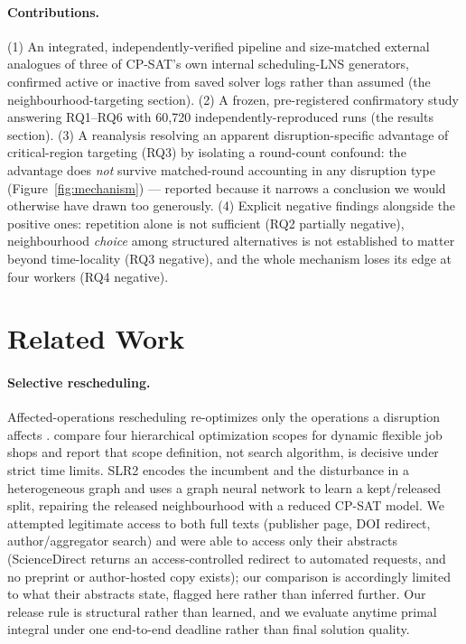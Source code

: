 \documentclass[letterpaper]{article} %
\begin{document}
\paragraph{Contributions.} (1) An integrated, independently-verified pipeline and size-matched external analogues of three of CP-SAT's own internal scheduling-LNS generators, confirmed active or inactive from saved solver logs rather than assumed (the neighbourhood-targeting section). (2) A frozen, pre-registered confirmatory study answering RQ1--RQ6 with 60{,}720 independently-reproduced runs (the results section). (3) A reanalysis resolving an apparent disruption-specific advantage of critical-region targeting (RQ3) by isolating a round-count confound: the advantage does \emph{not} survive matched-round accounting in any disruption type (Figure~\ref{fig:mechanism}) --- reported because it narrows a conclusion we would otherwise have drawn too generously. (4) Explicit negative findings alongside the positive ones: repetition alone is not sufficient (RQ2 partially negative), neighbourhood \emph{choice} among structured alternatives is not established to matter beyond time-locality (RQ3 negative), and the whole mechanism loses its edge at four workers (RQ4 negative).

\section{Related Work}

\paragraph{Selective rescheduling.} Affected-operations rescheduling re-optimizes only the operations a disruption affects \citep{abumaizar1997,subramaniam2003}. \citet{sun2026} compare four hierarchical optimization scopes for dynamic flexible job shops and report that scope definition, not search algorithm, is decisive under strict time limits. SLR2 \citep{linyang2026} encodes the incumbent and the disturbance in a heterogeneous graph and uses a graph neural network to learn a kept/released split, repairing the released neighbourhood with a reduced CP-SAT model. We attempted legitimate access to both full texts (publisher page, DOI redirect, author/aggregator search) and were able to access only their abstracts (ScienceDirect returns an access-controlled redirect to automated requests, and no preprint or author-hosted copy exists); our comparison is accordingly limited to what their abstracts state, flagged here rather than inferred further. Our release rule is structural rather than learned, and we evaluate anytime primal integral under one end-to-end deadline rather than final solution quality.
\end{document}
